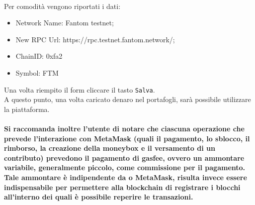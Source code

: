 \textbf{}\\
Per comodità vengono riportati i dati:
\begin{itemize}
    \item Network Name: Fantom testnet;
    \item New RPC Url: https://rpc.testnet.fantom.network/;
    \item ChainID: 0xfa2
    \item Symbol: FTM
\end{itemize}
Una volta riempito il form cliccare il tasto \texttt{Salva}.\\
A questo punto, una volta caricato denaro nel portafogli, sarà possibile utilizzare la piattaforma.\\\\
\textbf{Si raccomanda inoltre l'utente di notare che ciascuna operazione che prevede l'interazione con MetaMask (quali il pagamento, lo sblocco, il rimborso, la creazione della moneybox e il versamento di un contributo) prevedono il pagamento di gasfee, ovvero un ammontare variabile, generalmente piccolo, come commissione per il pagamento.\\
Tale ammontare è indipendente da \projectName{} o MetaMask, risulta invece essere indispensabile per permettere alla blockchain\glo{} di registrare i blocchi all'interno dei quali è possibile reperire le transazioni.}